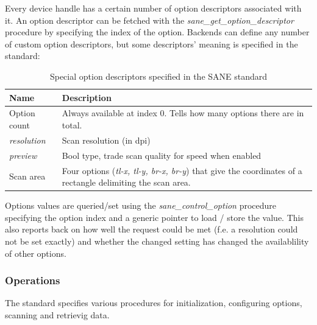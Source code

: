 \documentclass{article}
\begin{document}
Every device handle has a certain number of option descriptors associated
with it. An option descriptor can be fetched with the {\it sane\_get\_option\_descriptor}
procedure by specifying the index of the option.
Backends can define any number of custom option descriptors, but some
descriptors' meaning is specified in the standard:

\begin{table}[H]
  \caption{Special option descriptors specified in the SANE standard}
  \centering
  \begin{tabular}{p{3cm} | p{8cm}}
    Name & Description \\ \hline
      Option count & Always available at index 0. Tells how many options
                            there are in total. \\
      {\it resolution} & Scan resolution (in dpi) \\
      {\it preview} & Bool type, trade scan quality for speed when enabled \\
      Scan area & Four options ({\it tl-x, tl-y, br-x, br-y}) that give
                  the coordinates of a rectangle delimiting the scan area. \\
  \end{tabular}
\end{table}

\cite[4.5]{sane_standard}

Options values are queried/set using the {\it sane\_control\_option} procedure
specifying the option index and a generic pointer to load / store the value.
This also reports back on how well the request could be met (f.e. a resolution could
not be set exactly) and whether the changed setting has changed the availablility
of other options.

\cite[4.4]{sane_standard}

\subsubsection{Operations}

The standard specifies various procedures for initialization, configuring options,
scanning and retrievig data.
\end{document}
